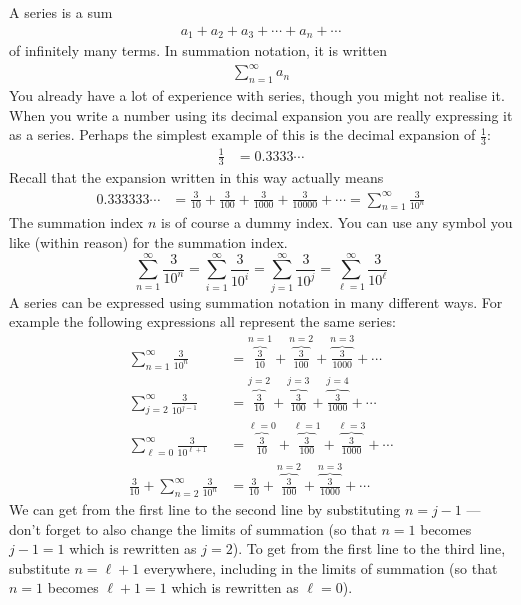 A series is a sum
\begin{align*}
a_1+a_2+a_3+\cdots+a_n+\cdots
\end{align*}
of infinitely many terms. In summation notation, it is written
\begin{align*}
\sum_{n=1}^\infty a_n
\end{align*}
You already have a lot of experience with series, though you might
not realise it. When you write a number using its decimal expansion
you are really expressing it as a series. Perhaps the simplest example
of this is the decimal expansion of $\frac{1}{3}$:
\begin{align*}
 \frac{1}{3} &= 0.3333\cdots
\end{align*}
Recall that the expansion written in this way actually means
\begin{align*}
0.333333\cdots &= \frac{3}{10}+\frac{3}{100}+\frac{3}{1000}+\frac{3}{10000}+\cdots
=\sum_{n=1}^\infty\frac{3}{10^n}
\end{align*}
The summation index $n$ is of course a dummy index. You can use any symbol
you like (within reason) for the summation index.
\begin{equation*}
\sum_{n=1}^\infty\frac{3}{10^n}
=\sum_{i=1}^\infty\frac{3}{10^i}
=\sum_{j=1}^\infty\frac{3}{10^j}
=\sum_{\ell=1}^\infty\frac{3}{10^\ell}
\end{equation*}
A series can be expressed using summation notation in many different
ways. For example the following expressions all represent the same series:
\begin{align*}
\sum_{n=1}^\infty\frac{3}{10^n}
 &= \overbrace{\frac{3}{10}}^{n=1}
    +\overbrace{\frac{3}{100}}^{n=2}
    +\overbrace{\frac{3}{1000}}^{n=3}+\cdots \\
\sum_{j=2}^\infty\frac{3}{10^{j-1}}
 &= \overbrace{\frac{3}{10}}^{j=2}
    +\overbrace{\frac{3}{100}}^{j=3}
    +\overbrace{\frac{3}{1000}}^{j=4}+\cdots
\\
\sum_{\ell=0}^\infty\frac{3}{10^{\ell+1}}
 &= \overbrace{\frac{3}{10}}^{\ell=0}
    +\overbrace{\frac{3}{100}}^{\ell=1}
    +\overbrace{\frac{3}{1000}}^{\ell=3}+\cdots
\\
\frac{3}{10}+\sum_{n=2}^\infty\frac{3}{10^n}
 &= \frac{3}{10}
    +\overbrace{\frac{3}{100}}^{n=2}
    +\overbrace{\frac{3}{1000}}^{n=3}+\cdots
\end{align*}
We can get from  the first line to the second line by substituting $n=j-1$ ---
don't forget to also change the limits of summation (so that $n=1$ becomes
$j-1=1$ which is rewritten as $j=2$).
To get from the first line to the
third line, substitute $n=\ell+1$ everywhere, including in the limits of summation (so that $n=1$ becomes $\ell+1=1$
which is rewritten as $\ell=0$).

